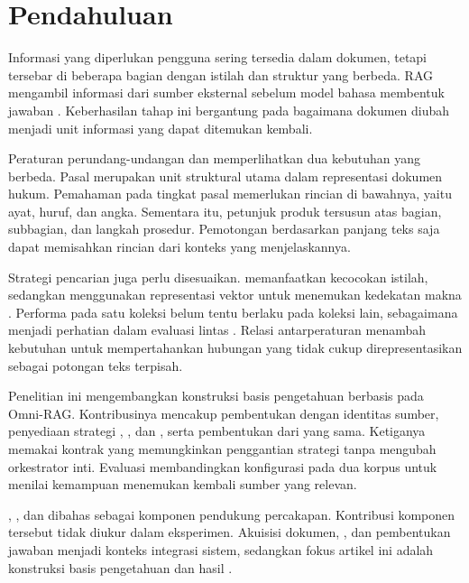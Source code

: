 \section{Pendahuluan}
Informasi yang diperlukan pengguna sering tersedia dalam dokumen, tetapi tersebar di beberapa bagian dengan istilah dan struktur yang berbeda. RAG mengambil informasi dari sumber eksternal sebelum model bahasa membentuk jawaban \cite{lewisRetrievalAugmentedGenerationKnowledgeIntensive2021}. Keberhasilan tahap ini bergantung pada bagaimana dokumen diubah menjadi unit informasi yang dapat ditemukan kembali.

Peraturan perundang-undangan dan  memperlihatkan dua kebutuhan yang berbeda. Pasal merupakan unit struktural utama dalam representasi dokumen hukum. Pemahaman pada tingkat pasal memerlukan rincian di bawahnya, yaitu ayat, huruf, dan angka. Sementara itu, petunjuk produk tersusun atas bagian, subbagian, dan langkah prosedur. Pemotongan berdasarkan panjang teks saja dapat memisahkan rincian dari konteks yang menjelaskannya.

Strategi pencarian juga perlu disesuaikan.  memanfaatkan kecocokan istilah, sedangkan  menggunakan representasi vektor untuk menemukan kedekatan makna \cite{robertsonProbabilisticRelevanceFramework2009,karpukhinDensePassageRetrieval2020}. Performa pada satu koleksi belum tentu berlaku pada koleksi lain, sebagaimana menjadi perhatian dalam evaluasi lintas  \cite{thakurBEIRHeterogeneousBenchmark2021}. Relasi antarperaturan menambah kebutuhan untuk mempertahankan hubungan yang tidak cukup direpresentasikan sebagai potongan teks terpisah.

Penelitian ini mengembangkan  konstruksi basis pengetahuan berbasis  pada Omni-RAG. Kontribusinya mencakup pembentukan  dengan identitas sumber, penyediaan strategi , , dan , serta pembentukan  dari  yang sama. Ketiganya memakai kontrak yang memungkinkan penggantian strategi tanpa mengubah orkestrator inti. Evaluasi membandingkan konfigurasi pada dua korpus untuk menilai kemampuan menemukan kembali sumber yang relevan.

, , dan  dibahas sebagai komponen pendukung percakapan. Kontribusi komponen tersebut tidak diukur dalam eksperimen. Akuisisi dokumen, , dan pembentukan jawaban menjadi konteks integrasi sistem, sedangkan fokus artikel ini adalah konstruksi basis pengetahuan dan hasil .
